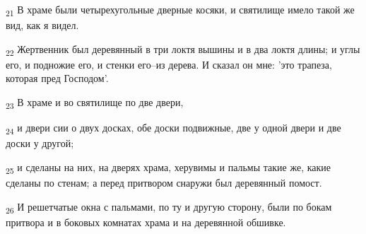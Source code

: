 \begin{tcolorbox}
\textsubscript{21} В храме были четырехугольные дверные косяки, и святилище имело такой же вид, как я видел.
\end{tcolorbox}
\begin{tcolorbox}
\textsubscript{22} Жертвенник был деревянный в три локтя вышины и в два локтя длины; и углы его, и подножие его, и стенки его--из дерева. И сказал он мне: 'это трапеза, которая пред Господом'.
\end{tcolorbox}
\begin{tcolorbox}
\textsubscript{23} В храме и во святилище по две двери,
\end{tcolorbox}
\begin{tcolorbox}
\textsubscript{24} и двери сии о двух досках, обе доски подвижные, две у одной двери и две доски у другой;
\end{tcolorbox}
\begin{tcolorbox}
\textsubscript{25} и сделаны на них, на дверях храма, херувимы и пальмы такие же, какие сделаны по стенам; а перед притвором снаружи был деревянный помост.
\end{tcolorbox}
\begin{tcolorbox}
\textsubscript{26} И решетчатые окна с пальмами, по ту и другую сторону, были по бокам притвора и в боковых комнатах храма и на деревянной обшивке.
\end{tcolorbox}
